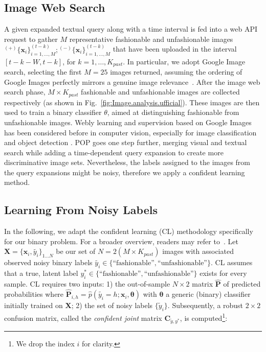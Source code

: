 \documentclass[runningheads]{llncs}
\newcommand{\snamebig}[0] {POP\xspace}
\begin{document}
\subsection{Image Web Search} \label{sec:IWS} A given expanded textual query along with a time interval is fed into a web API request to gather $M$ representative fashionable and unfashionable images ${}^{(+)}\{\mathbf{x}_i\}_{i=1,\ldots,M}^{(t-k)}; {}^{(-)}\{\mathbf{x}_i\}_{i=1,\ldots,M}^{(t-k)}$ that have been uploaded in the interval $[t-k-W,t-k]$, for $k=1,\ldots,K_{past}$. In particular, we adopt Google Image search,
selecting the first $M = 25$ images returned, assuming the ordering of Google Images perfectly mirrors a genuine image relevance~\cite{google_visualrank}. After the image web search phase, $M\times K_{past}$ fashionable and unfashionable images are collected respectively (as shown in Fig.~\ref{fig:Image.analysis.ufficial}). These images are then used to train a binary classifier $\theta$, aimed at distinguishing fashionable from unfashionable images. Webly learning and supervision based on Google Images has been considered before in computer vision, especially for image classification and object detection \cite{Fergus_googleimages_2005,chen_webly_2015,Li_webly_2021}. \snamebig goes one step further, merging visual and textual search while adding a time-dependent query expansion to create more discriminative image sets. Nevertheless, the labels assigned to the images from the query expansions might be noisy, therefore we apply a confident learning method.

\subsection{Learning From Noisy Labels}\label{sec:LFNL}
In the following, we adapt the confident learning (CL) methodology specifically for our binary problem. For a broader overview, readers may refer to~\cite{northcutt2021confident}. Let $\mathbf{X} = \{\mathbf{x}_i,\tilde{y_i}\}_{1 \ldots N}$ be our set of $N=2(M\times K_{past})$ images with associated observed noisy binary labels $\tilde{y_i} \in \{\text{``fashionable''},\text{``unfashionable''}\}$. CL assumes that a true, latent label $y^*_i \in \{\text{``fashionable''},\text{``unfashionable''}\}$ exists for every sample. CL requires two inputs: 1) the out-of-sample $N\times2$ matrix $\mathbf{\hat{P}}$ of predicted probabilities where $\mathbf{\hat{P}}_{i,h} = \hat{p}(\tilde{y_i}=h;\mathbf{x}_i,\mathbf{\theta})$ with $\mathbf{\theta}$ a generic (binary) classifier initially trained on $\mathbf{X}$; 2) the set of noisy labels $\{\tilde{y}_i\}$. Subsequently, a robust $2\times 2$ confusion matrix, called the \emph{confident joint} matrix $\mathbf{C}_{\tilde{y},y^*}$, is computed\footnote{We drop the index $i$ for clarity.}:
\end{document}

